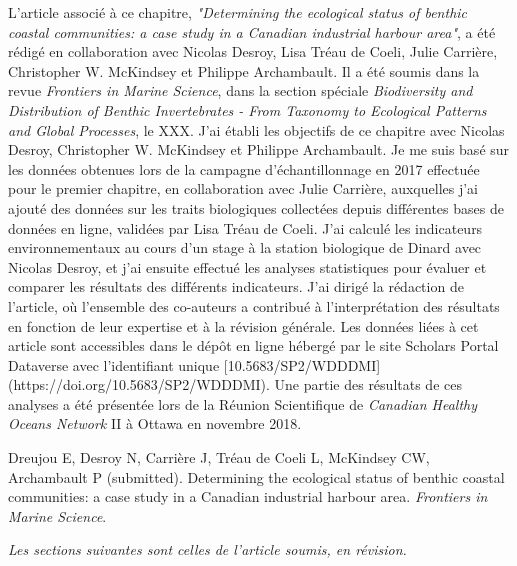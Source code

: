 L'article associé à ce chapitre, \textit{"Determining the ecological status of benthic coastal communities: a case study in a Canadian industrial harbour area"}, a été rédigé en collaboration avec Nicolas Desroy, Lisa Tréau de Coeli, Julie Carrière, Christopher W. McKindsey et Philippe Archambault. Il a été soumis dans la revue \textit{Frontiers in Marine Science}, dans la section spéciale \textit{Biodiversity and Distribution of Benthic Invertebrates - From Taxonomy to Ecological Patterns and Global Processes}, le XXX. J'ai établi les objectifs de ce chapitre avec Nicolas Desroy, Christopher W. McKindsey et Philippe Archambault. Je me suis basé sur les données obtenues lors de la campagne d'échantillonnage en 2017 effectuée pour le premier chapitre, en collaboration avec Julie Carrière, auxquelles j'ai ajouté des données sur les traits biologiques collectées depuis différentes bases de données en ligne, validées par Lisa Tréau de Coeli. J'ai calculé les indicateurs environnementaux au cours d'un stage à la station biologique de Dinard avec Nicolas Desroy, et j'ai ensuite effectué les analyses statistiques pour évaluer et comparer les résultats des différents indicateurs. J'ai dirigé la rédaction de l'article, où l'ensemble des co-auteurs a contribué à l'interprétation des résultats en fonction de leur expertise et à la révision générale. Les données liées à cet article sont accessibles dans le dépôt en ligne hébergé par le site Scholars Portal Dataverse avec l'identifiant unique [10.5683/SP2/WDDDMI](https://doi.org/10.5683/SP2/WDDDMI). Une partie des résultats de ces analyses a été présentée lors de la Réunion Scientifique de \textit{Canadian Healthy Oceans Network} II à Ottawa en novembre 2018. \linebreak[4]

\begin{singlespace}
Dreujou E, Desroy N, Carrière J, Tréau de Coeli L, McKindsey CW, Archambault P (submitted). Determining the ecological status of benthic coastal communities: a case study in a Canadian industrial harbour area. \textit{Frontiers in Marine Science}.
\end{singlespace}

\textit{Les sections suivantes sont celles de l’article soumis, en révision.}
